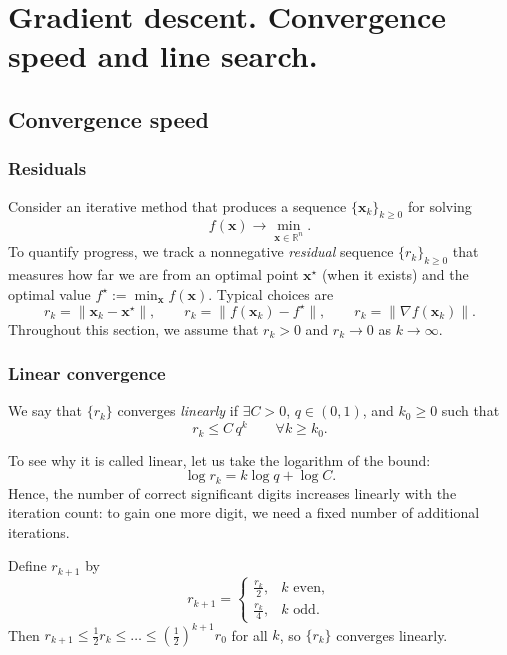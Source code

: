 \chapter{Gradient descent. Convergence speed and line search.}

\graphicspath{{chapters/02_gradient_descent/figures}}
\begin{abstract}
We introduce standard notions of convergence speed for iterative methods and
use them to study gradient descent. Under Lipschitz smoothness (and, when
available, convexity or strong convexity), we derive typical sublinear or
linear rates. We also describe practical line-search rules for choosing step
sizes in descent methods. In particular, we discuss the Armijo and Wolfe
conditions and the basic \emph{expand--zoom} and \emph{backtracking} procedures.
\end{abstract}

\section{Convergence speed}
\subsection{Residuals}
Consider an iterative method that produces a sequence $\{\mathbf{x}_k\}_{k\ge 0}$ for
solving
\[
  f(\mathbf{x})\to \min_{\mathbf{x}\in\mathbb{R}^n}.
\]
To quantify progress, we track a nonnegative \emph{residual} sequence
$\{r_k\}_{k\ge 0}$ that measures how far we are from an optimal point
$\mathbf{x}^\star$ (when it exists) and the optimal value
$f^\star:=\min_{\mathbf{x}} f(\mathbf{x})$. Typical
choices are
\[
  r_k = \|\mathbf{x}_k-\mathbf{x}^\star\|,
  \qquad
  r_k = \|f(\mathbf{x}_k)-f^\star\|,
  \qquad
  r_k = \|\nabla f(\mathbf{x}_k)\|.
\]
Throughout this section, we assume that $r_k>0$ and $r_k\to 0$ as $k\to\infty$.

\subsection{Linear convergence}
\begin{definition}
We say that $\{r_k\}$ converges \emph{linearly} if $\exists C>0$,
$q\in(0,1)$, and $k_0\ge 0$ such that
\[
  r_{k}\le C\,q^k\qquad \forall k\ge k_0.
\]
\end{definition}

To see why it is called linear, let us take the logarithm of the bound:
\[
\log r_k = k \log q + \log C.
\]
Hence, the number of correct significant digits increases linearly with the iteration
count: to gain one more digit, we need a fixed number of additional iterations.
\begin{example}
Define $r_{k+1}$ by
\[
  r_{k+1}=
  \begin{cases}
    \frac{r_k}{2}, & k \text{ even},\\[2pt]
    \frac{r_k}{4}, & k \text{ odd}.
  \end{cases}
\]
Then $r_{k+1}\le \frac12 r_k\le \ldots \le \left(\frac12\right)^{k+1}r_0$ for all $k$,
so $\{r_k\}$ converges linearly.
\end{example}

